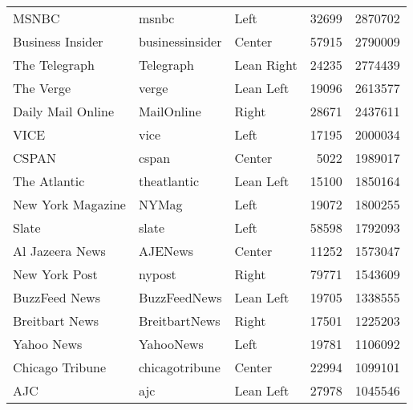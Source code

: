 \begin{tabular}{lllrr}
                                    MSNBC &            msnbc &          Left &             32699 &    2870702 \\
                         Business Insider &  businessinsider &        Center &             57915 &    2790009 \\
                            The Telegraph &        Telegraph &    Lean Right &             24235 &    2774439 \\
                                The Verge &            verge &     Lean Left &             19096 &    2613577 \\
                        Daily Mail Online &       MailOnline &         Right &             28671 &    2437611 \\
                                     VICE &             vice &          Left &             17195 &    2000034 \\
                                    CSPAN &            cspan &        Center &              5022 &    1989017 \\
                             The Atlantic &      theatlantic &     Lean Left &             15100 &    1850164 \\
                        New York Magazine &            NYMag &          Left &             19072 &    1800255 \\
                                    Slate &            slate &          Left &             58598 &    1792093 \\
                          Al Jazeera News &          AJENews &        Center &             11252 &    1573047 \\
                            New York Post &           nypost &         Right &             79771 &    1543609 \\
                            BuzzFeed News &     BuzzFeedNews &     Lean Left &             19705 &    1338555 \\
                           Breitbart News &    BreitbartNews &         Right &             17501 &    1225203 \\
                               Yahoo News &        YahooNews &          Left &             19781 &    1106092 \\
                          Chicago Tribune &   chicagotribune &        Center &             22994 &    1099101 \\
                                      AJC &              ajc &     Lean Left &             27978 &    1045546 \\

\end{tabular}
